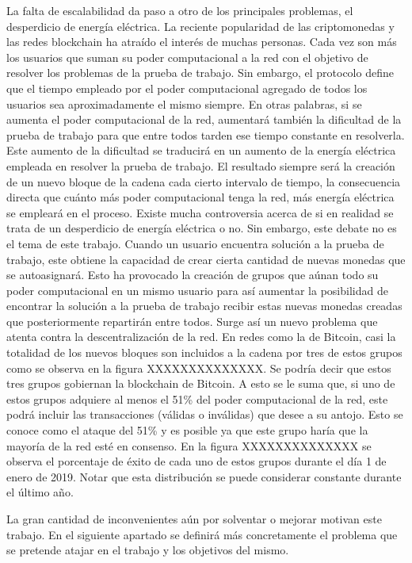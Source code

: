 La falta de escalabilidad da paso a otro de los principales problemas, el desperdicio de energía eléctrica. La reciente popularidad de las criptomonedas y las redes blockchain ha atraído el interés de muchas personas. Cada vez son más los usuarios que suman su poder computacional a la red con el objetivo de resolver los problemas de la prueba de trabajo. Sin embargo, el protocolo define que el tiempo empleado por el poder computacional agregado de todos los usuarios sea aproximadamente el mismo siempre. En otras palabras, si se aumenta el poder computacional de la red, aumentará también la dificultad de la prueba de trabajo para que entre todos tarden ese tiempo constante en resolverla. Este aumento de la dificultad se traducirá en un aumento de la energía eléctrica empleada en resolver la prueba de trabajo. El resultado siempre será la creación de un nuevo bloque de la cadena cada cierto intervalo de tiempo, la consecuencia directa que cuánto más poder computacional tenga la red, más energía eléctrica se empleará en el proceso. Existe mucha controversia acerca de si en realidad se trata de un desperdicio de energía eléctrica o no. Sin embargo, este debate no es el tema de este trabajo.
Cuando un usuario encuentra solución a la prueba de trabajo, este obtiene la capacidad de crear cierta cantidad de nuevas monedas que se autoasignará. Esto ha provocado la creación de grupos que aúnan todo su poder computacional en un mismo usuario para así aumentar la posibilidad de encontrar la solución a la prueba de trabajo recibir estas nuevas monedas creadas que posteriormente repartirán entre todos. Surge así un nuevo problema que atenta contra la descentralización de la red. En redes como la de Bitcoin, casi la totalidad de los nuevos bloques son incluidos a la cadena por tres de estos grupos como se observa en la figura XXXXXXXXXXXXXX. Se podría decir que estos tres grupos gobiernan la blockchain de Bitcoin. A esto se le suma que, si uno de estos grupos adquiere al menos el 51\% del poder computacional de la red, este podrá incluir las transacciones (válidas o inválidas) que desee a su antojo. Esto se conoce como el ataque del 51\% y es posible ya que este grupo haría que la mayoría de la red esté en consenso. En la figura XXXXXXXXXXXXXX se observa el porcentaje de éxito de cada uno de estos grupos durante el día 1 de enero de 2019. Notar que esta distribución se puede considerar constante durante el último año. \newline

La gran cantidad de inconvenientes aún por solventar o mejorar motivan este trabajo. En el siguiente apartado se definirá más concretamente el problema que se pretende atajar en el trabajo y los objetivos del mismo.\newline


